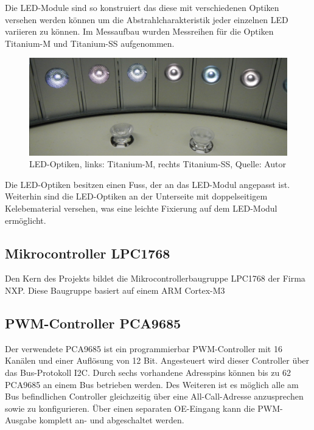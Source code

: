 \documentclass[a4paper,12pt]{scrartcl}
\begin{document}
Die LED-Module sind so konstruiert das diese mit verschiedenen Optiken versehen werden k\"onnen um die Abstrahlcharakteristik jeder einzelnen LED variieren zu
k\"onnen. Im Messaufbau wurden Messreihen f\"ur die Optiken Titanium-M und Titanium-SS aufgenommen.
\begin{figure}[htb]
\begin{center}
  \includegraphics[width=1\hsize]{./images/foto_hardware_optiken.png}
\end{center}
\caption[LED-Optiken, links: Titanium-M, rechts Titanium-SS, Quelle:
Autor]{\label{fotohwoptiken}LED-Optiken, links: Titanium-M, rechts Titanium-SS, Quelle:
Autor}
\end{figure}
Die LED-Optiken besitzen einen Fuss, der an das LED-Modul angepasst ist. Weiterhin sind die LED-Optiken an der Unterseite mit doppelseitigem Kelebematerial
versehen, was eine leichte Fixierung auf dem LED-Modul erm\"oglicht.

\subsection{Mikrocontroller LPC1768}
Den Kern des Projekts bildet die Mikrocontrollerbaugruppe LPC1768 der Firma NXP. Diese Baugruppe basiert auf einem ARM Cortex-M3 

\cite{speclpc1768}

\subsection{PWM-Controller PCA9685}

Der verwendete PCA9685 ist ein programmierbar PWM-Controller mit 16 Kanälen und einer Auflösung von 12 Bit. Angesteuert wird dieser Controller über das Bus-Protokoll I2C. Durch sechs vorhandene Adresspins können bis zu 62 PCA9685 an einem Bus betrieben werden. Des Weiteren ist es möglich alle am Bus befindlichen Controller gleichzeitig über eine All-Call-Adresse anzusprechen sowie zu konfigurieren. Über einen separaten OE-Eingang kann die PWM-Ausgabe komplett an- und abgeschaltet werden.
\end{document}
